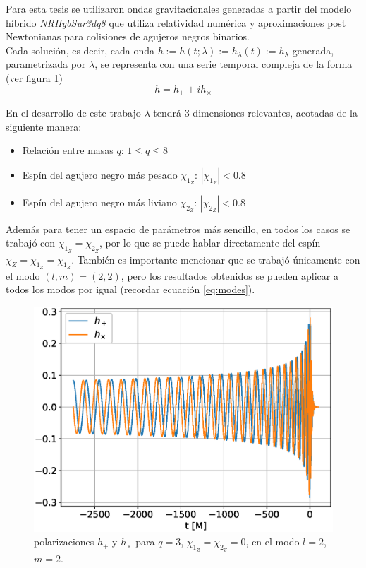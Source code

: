 Para esta tesis se utilizaron ondas gravitacionales generadas a partir del modelo híbrido \textit{NRHybSur3dq8}\cite{Varma_2019} que utiliza relatividad numérica y aproximaciones post Newtonianas para colisiones de agujeros negros binarios.
\\

Cada solución, es decir, cada onda \( h := h(t; \lambda) := h_{\lambda}(t) := h_{\lambda} \) generada, parametrizada por $\lambda$, se representa con una serie temporal compleja de la forma (ver figura \ref{fig:h_q3})
\[
h = h_+ + ih_{\times}
\]

En el desarrollo de este trabajo \(\lambda\) tendrá 3 dimensiones relevantes, acotadas de la siguiente manera:

\begin{itemize}
\item Relación entre masas $q$: $1 \le q \le 8$
\item Espín del agujero negro más pesado $\chi_{1_Z}$: $|\chi_{1_Z}| < 0.8$
\item Espín del agujero negro más liviano $\chi_{2_Z}$: $|\chi_{2_Z}| < 0.8$
\end{itemize}

Además para tener un espacio de parámetros más sencillo, en todos los casos se trabajó con $\chi_{1_Z} = \chi_{2_Z}$, por lo que se puede hablar directamente del espín $\chi_{Z}=\chi_{1_Z} = \chi_{1_Z}$. También es importante mencionar que se trabajó únicamente con el modo $(l, m) =(2, 2)$, pero los resultados obtenidos se pueden aplicar a todos los modos por igual (recordar ecuación \eqref{eq:modes}).

\begin{figure}[h]
\centering
\includegraphics[width=.9\columnwidth]{figs/h_l2m2_q3.eps}
\caption{polarizaciones \(h_+\) y \(h_{\times}\) para $q = 3$, $\chi_{1_Z} = \chi_{2_Z} = 0$, en el modo $l=2$, $m=2$.}
\label{fig:h_q3}
\end{figure}



